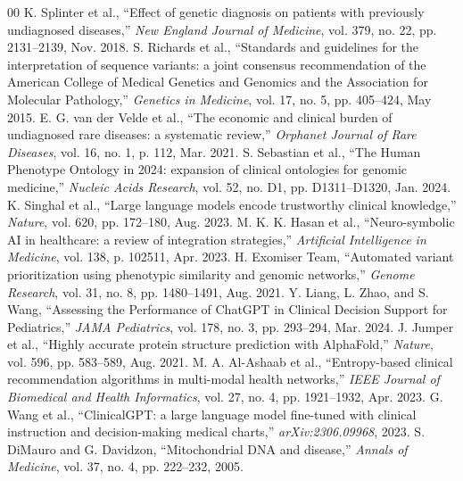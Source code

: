 \documentclass[conference]{IEEEtran}
\begin{document}
\begin{thebibliography}{00}
 K. Splinter et al., ``Effect of genetic diagnosis on patients with previously undiagnosed diseases,'' \textit{New England Journal of Medicine}, vol. 379, no. 22, pp. 2131--2139, Nov. 2018.
 S. Richards et al., ``Standards and guidelines for the interpretation of sequence variants: a joint consensus recommendation of the American College of Medical Genetics and Genomics and the Association for Molecular Pathology,'' \textit{Genetics in Medicine}, vol. 17, no. 5, pp. 405--424, May 2015.
 E. G. van der Velde et al., ``The economic and clinical burden of undiagnosed rare diseases: a systematic review,'' \textit{Orphanet Journal of Rare Diseases}, vol. 16, no. 1, p. 112, Mar. 2021.
 S. Sebastian et al., ``The Human Phenotype Ontology in 2024: expansion of clinical ontologies for genomic medicine,'' \textit{Nucleic Acids Research}, vol. 52, no. D1, pp. D1311--D1320, Jan. 2024.
 K. Singhal et al., ``Large language models encode trustworthy clinical knowledge,'' \textit{Nature}, vol. 620, pp. 172--180, Aug. 2023.
 M. K. K. Hasan et al., ``Neuro-symbolic AI in healthcare: a review of integration strategies,'' \textit{Artificial Intelligence in Medicine}, vol. 138, p. 102511, Apr. 2023.
 H. Exomiser Team, ``Automated variant prioritization using phenotypic similarity and genomic networks,'' \textit{Genome Research}, vol. 31, no. 8, pp. 1480--1491, Aug. 2021.
 Y. Liang, L. Zhao, and S. Wang, ``Assessing the Performance of ChatGPT in Clinical Decision Support for Pediatrics,'' \textit{JAMA Pediatrics}, vol. 178, no. 3, pp. 293--294, Mar. 2024.
 J. Jumper et al., ``Highly accurate protein structure prediction with AlphaFold,'' \textit{Nature}, vol. 596, pp. 583--589, Aug. 2021.
 M. A. Al-Ashaab et al., ``Entropy-based clinical recommendation algorithms in multi-modal health networks,'' \textit{IEEE Journal of Biomedical and Health Informatics}, vol. 27, no. 4, pp. 1921--1932, Apr. 2023.
 G. Wang et al., ``ClinicalGPT: a large language model fine-tuned with clinical instruction and decision-making medical charts,'' \textit{arXiv:2306.09968}, 2023.
 S. DiMauro and G. Davidzon, ``Mitochondrial DNA and disease,'' \textit{Annals of Medicine}, vol. 37, no. 4, pp. 222--232, 2005.
\end{thebibliography}
\end{document}
